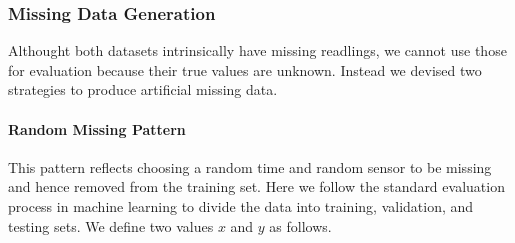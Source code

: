 



\subsubsection{Missing Data Generation}


Althought both datasets intrinsically have missing readlings, we cannot use those for evaluation because their true values are unknown. Instead we devised two strategies to produce artificial missing data.
\paragraph*{Random Missing Pattern}

This pattern reflects choosing a random time and random sensor to be missing and hence removed from the training set. Here we follow the standard evaluation process in machine learning to divide the data into training, validation, and testing sets.
We define two values $x$ and $y$ as follows.

